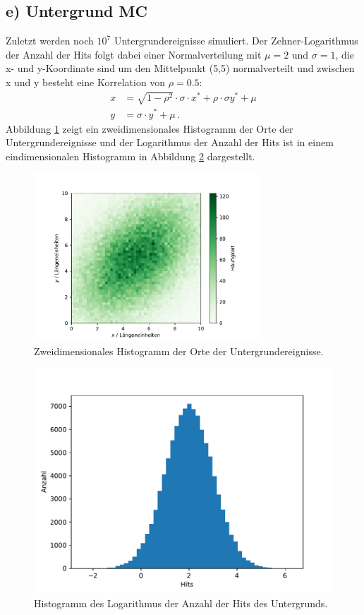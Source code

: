 \documentclass[a4paper, 11pt]{article}
\begin{document}
\subsection*{e) Untergrund MC}
Zuletzt werden noch $10^7$ Untergrundereignisse simuliert. Der Zehner-Logarithmus
der Anzahl der Hits folgt dabei einer Normalverteilung mit $\mu = 2$ und $\sigma=1$,
die x- und y-Koordinate sind um den Mittelpunkt (5,5) normalverteilt und zwischen
x und y besteht eine Korrelation von $\rho=0.5$:
\begin{align}
  x &= \sqrt{1-\rho^2} \cdot \sigma \cdot x^\text{*} + \rho \cdot \sigma y^\text{*} + \mu\\
  y &= \sigma \cdot y^\text{*} + \mu \,.
\end{align}
Abbildung \ref{fig:orte-background} zeigt ein zweidimensionales Histogramm der
Orte der Untergrundereignisse und der Logarithmus der Anzahl der Hits ist in einem
eindimensionalen Histogramm in Abbildung \ref{fig:hits-background} dargestellt.
\begin{figure}
  \centering
  \includegraphics[width=0.75\textwidth]{../A11/OrteBackground.pdf}
  \caption{Zweidimensionales Histogramm der Orte der Untergrundereignisse.}
  \label{fig:orte-background}
\end{figure}
\begin{figure}
  \centering
  \includegraphics[width=\textwidth]{../A11/HitsBackground.pdf}
  \caption{Histogramm des Logarithmus der Anzahl der Hits des Untergrunds.}
  \label{fig:hits-background}
\end{figure}
\end{document}
